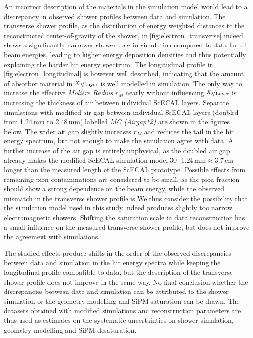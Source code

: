 \documentclass[twoside,a4paper,12pt]{article}
\begin{document}
An incorrect description of the materials in the simulation model would lead to a discrepancy in observed shower profiles between data and simulation. The transverse shower profile, as the distribution of energy weighted distances to the reconstructed center-of-gravity of the shower, in \autoref{fig:electron_transverse} indeed shows a significantly narrower shower core in simulation compared to data for all beam energies, leading to higher energy deposition densities and thus potentially explaining the harder hit energy spectrum. The longitudinal profile in \autoref{fig:electron_longitudinal} is however well described, indicating that the amount of absorber material in $\nicefrac{X_0}{\text{Layer}}$ is well modelled in simulation. The only way to increase the effective \emph{Moli\`ere Radius} $r_M$ nearly without influencing $\nicefrac{X_0}{\text{Layer}}$ is increasing the thickness of air between individual ScECAL layers. Separate simulations with modified air gap between individual ScECAL layers (doubled from 1.24\,mm to 2.48\,mm) labelled \emph{MC (Airgap*2)} are shown in the figures below. The wider air gap slightly increases $r_M$ and reduces the tail in the hit energy spectrum, but not enough to make the simulation agree with data. A further increase of the air gap is entirely unphysical, as the doubled air gap already makes the modified ScECAL simulation model $30\cdot1.24\,\text{mm} \approx 3.7\,\text{cm}$ longer than the measured length of the ScECAL prototype. Possible effects from remaining pion contaminations are considered to be small, as the pion fraction should show a strong dependence on the beam energy, while the observed mismatch in the transverse shower profile is  We thus consider the possibility that the simulation model used in this study indeed produces slightly too narrow electromagnetic showers. Shifting the saturation scale in data reconstruction has a small influence on the measured transverse shower profile, but does not improve the agreement with simulations.

The studied effects produce shifts in the order of the observed discrepancies between data and simulation in the hit energy spectra while keeping the longitudinal profile compatible to data, but the description of the transverse shower profile does not improve in the same way. No final conclusion whether the discrepancies between data and simulation can be attributed to the shower simulation or the geometry modelling and SiPM saturation can be drawn.   
The datasets obtained with modified simulations and reconstruction parameters are thus used as estimates on the systematic uncertainties on shower simulation, geometry modelling and SiPM desaturation.
\end{document}
